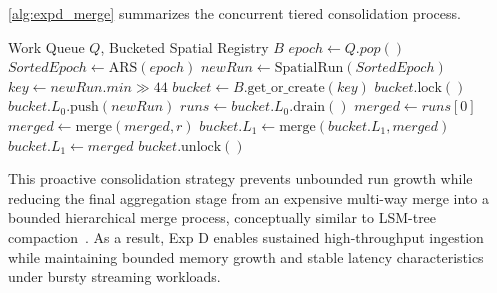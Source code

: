 \cref{alg:expd_merge} summarizes the concurrent tiered consolidation process.

\begin{algorithm}
\caption{Concurrent Tiered Spatial Consolidation}
\label{alg:expd_merge}
\begin{algorithmic}[1]
\REQUIRE Work Queue $Q$, Bucketed Spatial Registry $B$
\LOOP
    \STATE $epoch \gets Q.pop()$
    \STATE $SortedEpoch \gets \text{ARS}(epoch)$
    \STATE $newRun \gets \text{SpatialRun}(SortedEpoch)$
    \STATE $key \gets newRun.min \gg 44$
    \STATE $bucket \gets B.\text{get\_or\_create}(key)$
    \STATE $bucket.\text{lock}()$
    \STATE $bucket.L_0.\text{push}(newRun)$
        \STATE $runs \gets bucket.L_0.\text{drain}()$
        \STATE $merged \gets runs[0]$
            \STATE $merged \gets \text{merge}(merged, r)$
        \ENDFOR
            \STATE $bucket.L_1 \gets \text{merge}(bucket.L_1, merged)$
        \ELSE
            \STATE $bucket.L_1 \gets merged$
        \ENDIF
    \ENDIF
    \STATE $bucket.\text{unlock}()$
\ENDLOOP
\end{algorithmic}
\end{algorithm}

This proactive consolidation strategy prevents unbounded run growth while reducing the final aggregation stage from an expensive multi-way merge into a bounded hierarchical merge process, conceptually similar to LSM-tree compaction~\cite{oneilLogstructuredMergetreeLSMtree1996}.
As a result, Exp D enables sustained high-throughput ingestion while maintaining bounded memory growth and stable latency characteristics under bursty streaming workloads.
